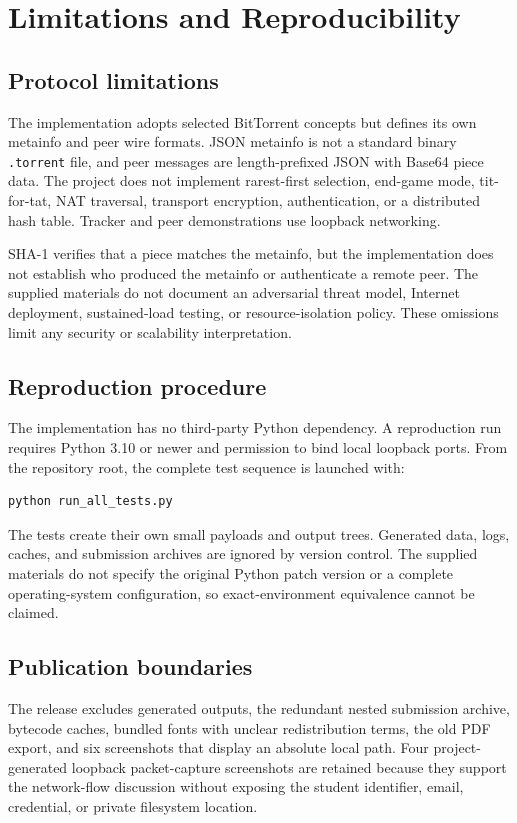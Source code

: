 \section{Limitations and Reproducibility}
\label{sec:limitations}

\subsection{Protocol limitations}

The implementation adopts selected BitTorrent concepts but defines its own metainfo and peer wire formats. JSON metainfo is not a standard binary \texttt{.torrent} file, and peer messages are length-prefixed JSON with Base64 piece data. The project does not implement rarest-first selection, end-game mode, tit-for-tat, NAT traversal, transport encryption, authentication, or a distributed hash table. Tracker and peer demonstrations use loopback networking.

SHA-1 verifies that a piece matches the metainfo, but the implementation does not establish who produced the metainfo or authenticate a remote peer. The supplied materials do not document an adversarial threat model, Internet deployment, sustained-load testing, or resource-isolation policy. These omissions limit any security or scalability interpretation.

\subsection{Reproduction procedure}

The implementation has no third-party Python dependency. A reproduction run requires Python 3.10 or newer and permission to bind local loopback ports. From the repository root, the complete test sequence is launched with:

\begin{lstlisting}[language=bash,numbers=none]
python run_all_tests.py
\end{lstlisting}

The tests create their own small payloads and output trees. Generated data, logs, caches, and submission archives are ignored by version control. The supplied materials do not specify the original Python patch version or a complete operating-system configuration, so exact-environment equivalence cannot be claimed.

\subsection{Publication boundaries}

The release excludes generated outputs, the redundant nested submission archive, bytecode caches, bundled fonts with unclear redistribution terms, the old PDF export, and six screenshots that display an absolute local path. Four project-generated loopback packet-capture screenshots are retained because they support the network-flow discussion without exposing the student identifier, email, credential, or private filesystem location.
